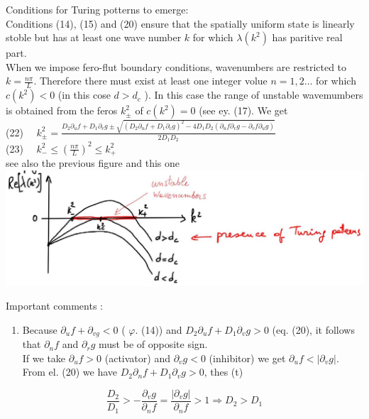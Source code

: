 \documentclass[10pt]{article}
\begin{document}
Conditions for Turing potterns to emerge:\\
Conditions (14), (15) and (20) ensure that the spatially uniform state is linearly stoble but has at least one wave number $k$ for which $\lambda\left(k^{2}\right)$ has paritive real part.\\
When we impose fero-flut boundary conditions, wavenumbers are restricted to $k=\frac{n \pi}{L}$. Therefore there must exist at least one integer volue $n=1,2 \ldots$ for which $c\left(k^{2}\right)<0$ (in this cose $d>d_{c}$ ). In this case the range of unstable wavemumbers is obtained from the feros $k_{ \pm}^{2}$ of $c\left(k^{2}\right)=0$ (see ey. (17). We get\\
(22) $\quad k_{ \pm}^{2}=\frac{D_{2} \partial_{u} f+D_{1} \partial_{v} g \pm \sqrt{\left(D_{2} \partial_{u} f+D_{1} \partial_{v} g\right)^{2}-4 D_{1} D_{2}\left(\partial_{u} f \partial_{v} g-\partial_{v} f \partial_{u} g\right)}}{2 D_{1} D_{2}}$\\
(23) $\quad k_{-}^{2} \leqslant\left(\frac{n \pi}{L}\right)^{2} \leqslant k_{+}^{2}$\\
see also the previous figure and this one\\
\includegraphics[max width=\textwidth, center]{2025_10_17_3cf351a4349ae3691080g-10}

Important comments :

\begin{enumerate}
  \item Because $\partial_{u} f+\partial_{v g}<0$ ( $\varphi$. (14)) and $D_{2} \partial_{u} f+D_{1} \partial_{v} g>0$ (eq. (20), it follows that $\partial_{n} f$ and $\partial_{r} g$ must be of opposite sign.\\
If we take $\partial_{u} f>0$ (activator) and $\partial_{v} g<0$ (inhibitor) we get $\partial_{u} f<\left|\partial_{v} g\right|$. From el. (20) we have $D_{2} \partial_{n} f+D_{1} \partial_{v} g>0$, thes (t)
\end{enumerate}


\begin{equation*}
\frac{D_{2}}{D_{1}}>-\frac{\partial_{v} g}{\partial_{n} f}=\frac{\left|\partial_{v} g\right|}{\partial_{n} f}>1 \Rightarrow D_{2}>D_{1} \tag{24}
\end{equation*}
\end{document}

